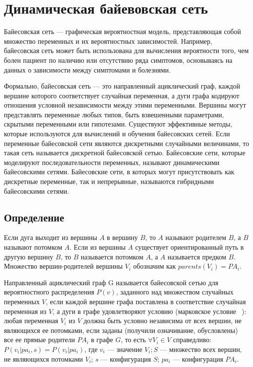 \section{Динамическая байевовская сеть}

Байесовская сеть — графическая вероятностная модель, представляющая собой множество переменных и их вероятностных зависимостей. Например, байесовская сеть может быть использована для вычисления вероятности того, чем болен пациент по наличию или отсутствию ряда симптомов, основываясь на данных о зависимости между симптомами и болезнями.

Формально, байесовская сеть — это направленный ациклический граф, каждой вершине которого соответствует случайная переменная, а дуги графа кодируют отношения условной независимости между этими переменными. Вершины могут представлять переменные любых типов, быть взвешенными параметрами, скрытыми переменными или гипотезами. Существуют эффективные методы, которые используются для вычислений и обучения байесовских сетей. Если переменные байесовской сети являются дискретными случайными величинами, то такая сеть называется дискретной байесовской сетью. Байесовские сети, которые моделируют последовательности переменных, называют динамическими байесовскими сетями. Байесовские сети, в которых могут присутствовать как дискретные переменные, так и непрерывные, называются гибридными байесовскими сетями. 

\subsection{Определение}

Если дуга выходит из вершины $A$ в вершину $B$, то $A$ называют родителем $B$, а $B$ называют потомком $A$. Если из вершины $A$ существует ориентированный путь в другую вершину $B$, то $B$ называется потомком $A$, а $A$ называется предком $B$. Множество вершин-родителей вершины $V_i$ обозначим как $parents(V_i) = PA_i$.

Направленный ациклический граф G называется байесовской сетью для вероятностного распределения $P(v)$, заданного над множеством случайных переменных $V$, если каждой вершине графа поставлена в соответствие случайная переменная из $V$, а дуги в графе удовлетворяют условию (марковское условие ~\cite{m_chain}): любая переменная $V_i$ из $V$ должна быть условно независима от всех вершин, не являющихся ее потомками, если заданы (получили означивание, обусловлены) все ее прямые родители $PA_i$ в графе $G$, то есть $\forall V_i \in V$ справедливо: $P(v_i|pa_i,s) = P(v_i|pa_i)$, где $v_i$ — значение $V_i; S$ — множество всех вершин, не являющихся потомками $V_i$; $s$ — конфигурация $S$; $pa_i$ — конфигурация $PA_i$.

